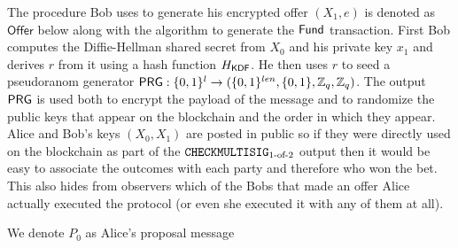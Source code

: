 \documentclass{article}
\theoremstyle{definition}
\begin{document}
\begin{center}
\end{center}


The procedure Bob uses to generate his encrypted offer $(X_1,e)$ is denoted as $\textsf{Offer}$ below along with the algorithm to generate the $\textsf{Fund}$ transaction. First Bob computes the Diffie-Hellman shared secret from $X_0$ and his private key $x_1$ and derives $r$ from it using a hash function $H_{\textsf{KDF}}$. He then uses $r$ to seed a pseudoranom generator $\textsf{PRG} : \{0,1\}^l \rightarrow (\{0,1\}^{len}, \{0,1\}, \mathbb{Z}_q,\mathbb{Z}_q)$. The output $\textsf{PRG}$ is used both to encrypt the payload of the message and to randomize the public keys that appear on the blockchain and the order in which they appear. Alice and Bob's keys $(X_0,X_1)$ are posted in public so if they were directly used on the blockchain as part of the
$\texttt{CHECKMULTISIG}_{\text{1-of-2}}$ output then it would be easy to associate the outcomes with each party and therefore who won the bet. This also hides from observers which of the Bobs that made an offer Alice actually executed the protocol (or even she executed it with any of them at all).

We denote $P_0$ as Alice's proposal message
\end{document}

